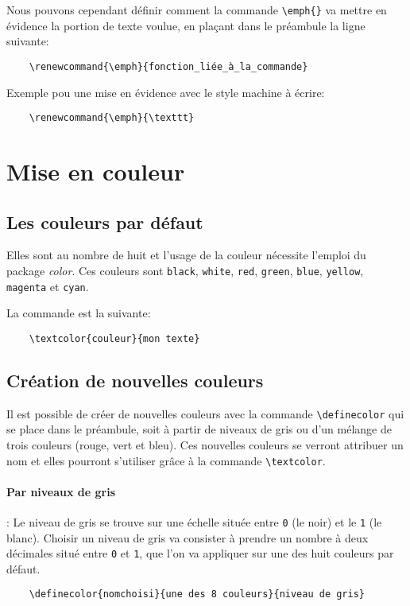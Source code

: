 Nous pouvons cependant définir comment la commande \verb|\emph{}| va mettre en évidence la portion de texte voulue, en plaçant dans le préambule la ligne suivante:
\begin{verbatim}
    \renewcommand{\emph}{fonction_liée_à_la_commande}
\end{verbatim}
\medskip

Exemple pou une mise en évidence avec le style \og machine à écrire\fg{}: 
\begin{verbatim}
    \renewcommand{\emph}{\texttt}
\end{verbatim}
\medskip

\section{Mise en couleur}
\subsection*{Les couleurs par défaut}
Elles sont au nombre de huit et l'usage de la couleur nécessite l'emploi du package \textit{color}. Ces couleurs sont \texttt{black}, \texttt{white}, \texttt{red}, \texttt{green}, \texttt{blue}, \texttt{yellow}, \texttt{magenta} et \texttt{cyan}.
\medskip

La commande est la suivante:
\begin{verbatim}
    \textcolor{couleur}{mon texte}
\end{verbatim}
\medskip

\subsection*{Création de nouvelles couleurs}
Il est possible de créer de nouvelles couleurs avec la commande \verb|\definecolor| qui se place dans le préambule, soit à partir de niveaux de gris ou d'un mélange de trois couleurs (rouge, vert et bleu). Ces nouvelles couleurs se verront attribuer un nom et elles pourront s'utiliser grâce à la commande \verb|\textcolor|.
\medskip

\paragraph*{Par niveaux de gris}: Le niveau de gris se trouve sur une échelle située entre \texttt{0} (le noir) et le \texttt{1} (le blanc). Choisir un niveau de gris va consister à prendre un nombre à deux décimales situé entre \texttt{0} et \texttt{1}, que l'on va appliquer sur une des huit couleurs par défaut.
\begin{verbatim}
    \definecolor{nomchoisi}{une des 8 couleurs}{niveau de gris}
\end{verbatim}
\medskip

